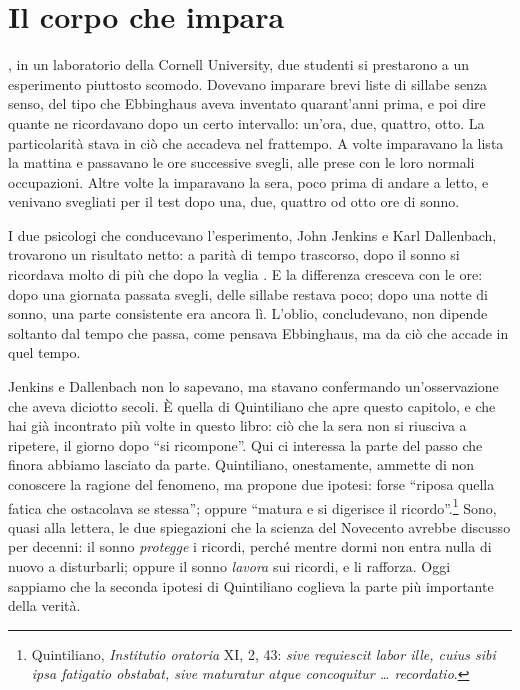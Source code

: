 \chapter{Il corpo che impara}
\label{cap:corpo}


, in un laboratorio della Cornell University,
due studenti si prestarono a un esperimento piuttosto
scomodo. Dovevano imparare brevi liste di sillabe senza senso, del
tipo che Ebbinghaus aveva inventato quarant'anni prima, e poi dire
quante ne ricordavano dopo un certo intervallo: un'ora, due, quattro,
otto. La particolarità stava in ciò che accadeva nel frattempo. A volte
imparavano la lista la mattina e passavano le ore successive svegli,
alle prese con le loro normali occupazioni. Altre volte la imparavano
la sera, poco prima di andare a letto, e venivano svegliati per il test
dopo una, due, quattro od otto ore di sonno.

I due psicologi che conducevano l'esperimento, John Jenkins e Karl
Dallenbach, trovarono un risultato netto: a parità di tempo trascorso,
dopo il sonno si ricordava molto di più che dopo la veglia
\parencite{jenkins1924}. E la differenza cresceva con le ore: dopo una
giornata passata svegli, delle sillabe restava poco; dopo una notte di
sonno, una parte consistente era ancora lì. L'oblio, concludevano, non
dipende soltanto dal tempo che passa, come pensava Ebbinghaus, ma da ciò
che accade in quel tempo.

Jenkins e Dallenbach non lo sapevano, ma stavano confermando
un'osservazione che aveva diciotto secoli. È quella di Quintiliano che
apre questo capitolo, e che hai già incontrato più volte in questo
libro: ciò che la sera non si riusciva a ripetere, il giorno dopo
\enquote{si ricompone}. Qui ci interessa la parte del passo che finora
abbiamo lasciato da parte. Quintiliano, onestamente, ammette di non
conoscere la ragione del fenomeno, ma propone due ipotesi: forse
\enquote{riposa quella fatica che ostacolava se stessa}; oppure
\enquote{matura e si digerisce il ricordo}.\footnote{Quintiliano,
\emph{Institutio oratoria} XI, 2, 43: \emph{sive requiescit labor ille,
cuius sibi ipsa fatigatio obstabat, sive maturatur atque concoquitur
\ldots{} recordatio}.} Sono, quasi alla lettera, le due spiegazioni
che la scienza del Novecento avrebbe discusso per decenni: il sonno
\emph{protegge} i ricordi, perché mentre dormi non entra nulla di nuovo
a disturbarli; oppure il sonno \emph{lavora} sui ricordi, e li
rafforza. Oggi sappiamo che la seconda ipotesi di Quintiliano coglieva
la parte più importante della verità.

